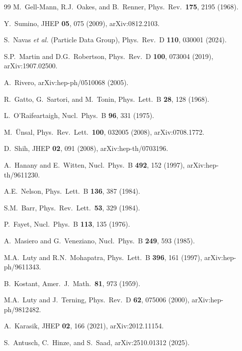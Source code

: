\documentclass[aps,prd,twocolumn,showpacs,preprintnumbers,superscriptaddress,floatfix]{revtex4-2}
\begin{document}
\begin{thebibliography}{99}
  M.~Gell-Mann, R.J.~Oakes, and B.~Renner,
  Phys.\ Rev.\ \textbf{175}, 2195 (1968).

  Y.~Sumino,
  JHEP \textbf{05}, 075 (2009),
  arXiv:0812.2103.

  S.~Navas \textit{et al.} (Particle Data Group),
  Phys.\ Rev.\ D \textbf{110}, 030001 (2024).

  S.P.~Martin and D.G.~Robertson,
  Phys.\ Rev.\ D \textbf{100}, 073004 (2019),
  arXiv:1907.02500.

  A.~Rivero,
  arXiv:hep-ph/0510068 (2005).

  R.~Gatto, G.~Sartori, and M.~Tonin,
  Phys.\ Lett.\ B \textbf{28}, 128 (1968).

  L.~O'Raifeartaigh,
  Nucl.\ Phys.\ B \textbf{96}, 331 (1975).

  M.~\"Unsal,
  Phys.\ Rev.\ Lett.\ \textbf{100}, 032005 (2008),
  arXiv:0708.1772.

  D.~Shih,
  JHEP \textbf{02}, 091 (2008),
  arXiv:hep-th/0703196.

  A.~Hanany and E.~Witten,
  Nucl.\ Phys.\ B \textbf{492}, 152 (1997),
  arXiv:hep-th/9611230.

  A.E.~Nelson,
  Phys.\ Lett.\ B \textbf{136}, 387 (1984).

  S.M.~Barr,
  Phys.\ Rev.\ Lett.\ \textbf{53}, 329 (1984).

  P.~Fayet,
  Nucl.\ Phys.\ B \textbf{113}, 135 (1976).

  A.~Masiero and G.~Veneziano,
  Nucl.\ Phys.\ B \textbf{249}, 593 (1985).

  M.A.~Luty and R.N.~Mohapatra,
  Phys.\ Lett.\ B \textbf{396}, 161 (1997),
  arXiv:hep-ph/9611343.

  B.~Kostant,
  Amer.\ J.\ Math.\ \textbf{81}, 973 (1959).

  M.A.~Luty and J.~Terning,
  Phys.\ Rev.\ D \textbf{62}, 075006 (2000),
  arXiv:hep-ph/9812482.

  A.~Karasik,
  JHEP \textbf{02}, 166 (2021),
  arXiv:2012.11154.

  S.~Antusch, C.~Hinze, and S.~Saad,
  arXiv:2510.01312 (2025).


\end{thebibliography}
\end{document}
